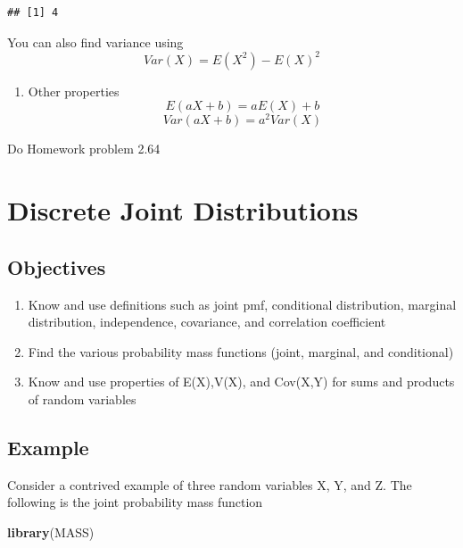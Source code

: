 \documentclass[]{book}
\newenvironment{Shaded}{\begin{snugshade}}{\end{snugshade}}
\newcommand{\KeywordTok}[1]{\textcolor[rgb]{0.13,0.29,0.53}{\textbf{#1}}}
\newcommand{\NormalTok}[1]{#1}
\providecommand{\tightlist}{%
  \setlength{\itemsep}{0pt}\setlength{\parskip}{0pt}}
\theoremstyle{definition}
\theoremstyle{definition}
\theoremstyle{definition}
\theoremstyle{remark}
\begin{document}
\begin{verbatim}
## [1] 4
\end{verbatim}

You can also find variance using \[Var(X)=E(X^2)-E(X)^2\]

\begin{enumerate}
\def\labelenumi{\arabic{enumi}.}
\setcounter{enumi}{4}
\tightlist
\item
  Other properties \[E(aX+b)=aE(X)+b\] \[Var(aX+b)=a^2Var(X)\]
\end{enumerate}

Do Homework problem 2.64

\hypertarget{L10}{\section{Discrete Joint Distributions}\label{L10}}

\subsection{Objectives}\label{objectives-9}

\begin{enumerate}
\def\labelenumi{\arabic{enumi}.}
\tightlist
\item
  Know and use definitions such as joint pmf, conditional distribution,
  marginal distribution, independence, covariance, and correlation
  coefficient\\
\item
  Find the various probability mass functions (joint, marginal, and
  conditional)\\
\item
  Know and use properties of E(X),V(X), and Cov(X,Y) for sums and
  products of random variables
\end{enumerate}

\subsection{Example}\label{example}

Consider a contrived example of three random variables X, Y, and Z. The
following is the joint probability mass function

\begin{Shaded}
\begin{Highlighting}[]
\KeywordTok{library}\NormalTok{(MASS)}
\end{Highlighting}
\end{Shaded}
\end{document}
